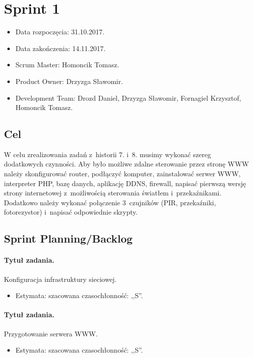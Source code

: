 \section{Sprint 1}
	\begin{itemize}
		\item Data rozpoczęcia: 31.10.2017.
		\item Data zakończenia: 14.11.2017.
		\item Scrum Master: Homoncik Tomasz.
		\item Product Owner: Drzyzga Sławomir.
		\item Development Team: Drozd Daniel, Drzyzga Sławomir, Fornagiel Krzysztof, Homoncik Tomasz.
	\end{itemize}
\subsection{Cel} 

	
	W celu zrealizowania zadań z~historii 7. i~8. musimy wykonać szereg dodatkowych czynności. Aby było możliwe zdalne sterowanie przez stronę WWW należy skonfigurować router, podłączyć komputer, zainstalować serwer WWW, interpreter PHP, bazę danych, aplikację DDNS, firewall, napisać pierwszą wersję strony internetowej z~możliwością sterowania światłem i~przekaźnikami. Dodatkowo należy wykonać połączenie 3~czujników (PIR, przekaźniki, fotorezystor) i~napisać odpowiednie skrypty.
	
	
	
\subsection{Sprint Planning/Backlog}
	
	\paragraph{Tytuł zadania.} Konfiguracja infrastruktury sieciowej.
	\begin{itemize}
		\item Estymata: szacowana czasochłonność: ,,S''.
	\end{itemize}
	
	\paragraph{Tytuł zadania.} Przygotowanie serwera WWW.
	\begin{itemize}
		\item Estymata: szacowana czasochłonność: ,,S''.
	\end{itemize}
	
